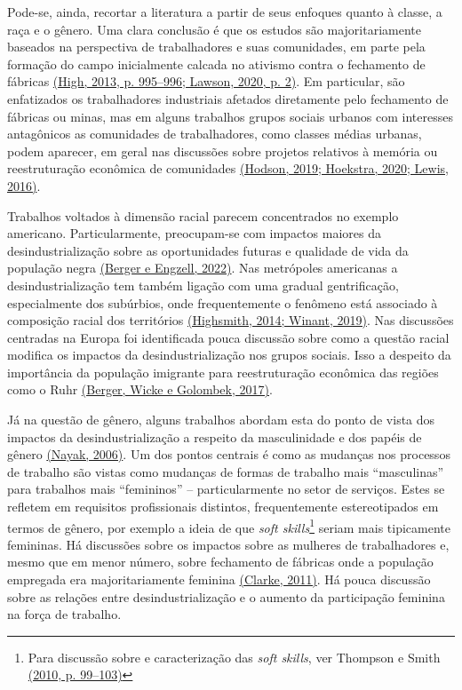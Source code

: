 Pode-se, ainda, recortar a literatura a partir de seus enfoques quanto à
classe, a raça e o gênero. Uma clara conclusão é que os estudos são
majoritariamente baseados na perspectiva de trabalhadores e suas
comunidades, em parte pela formação do campo inicialmente calcada no
ativismo contra o fechamento de fábricas
\href{https://www.zotero.org/google-docs/?ZgRt6K}{(High, 2013, p.
995--996; Lawson, 2020, p. 2)}. Em particular, são enfatizados os
trabalhadores industriais afetados diretamente pelo fechamento de
fábricas ou minas, mas em alguns trabalhos grupos sociais urbanos com
interesses antagônicos as comunidades de trabalhadores, como classes
médias urbanas, podem aparecer, em geral nas discussões sobre projetos
relativos à memória ou reestruturação econômica de comunidades
\href{https://www.zotero.org/google-docs/?73nnBO}{(Hodson, 2019;
Hoekstra, 2020; Lewis, 2016)}.

Trabalhos voltados à dimensão racial parecem concentrados no exemplo
americano. Particularmente, preocupam-se com impactos maiores da
desindustrialização sobre as oportunidades futuras e qualidade de vida
da população negra
\href{https://www.zotero.org/google-docs/?vlrv6U}{(Berger e Engzell,
2022)}. Nas metrópoles americanas a desindustrialização tem também
ligação com uma gradual gentrificação, especialmente dos subúrbios, onde
frequentemente o fenômeno está associado à composição racial dos
territórios
\href{https://www.zotero.org/google-docs/?XohD0P}{(Highsmith, 2014;
Winant, 2019)}. Nas discussões centradas na Europa foi identificada
pouca discussão sobre como a questão racial modifica os impactos da
desindustrialização nos grupos sociais. Isso a despeito da importância
da população imigrante para reestruturação econômica das regiões como o
Ruhr \href{https://www.zotero.org/google-docs/?JhbIrM}{(Berger, Wicke e
Golombek, 2017)}.

Já na questão de gênero, alguns trabalhos abordam esta do ponto de vista
dos impactos da desindustrialização a respeito da masculinidade e dos
papéis de gênero
\href{https://www.zotero.org/google-docs/?iCkdQR}{(Nayak, 2006)}. Um dos
pontos centrais é como as mudanças nos processos de trabalho são vistas
como mudanças de formas de trabalho mais ``masculinas'' para trabalhos
mais ``femininos'' -- particularmente no setor de serviços. Estes se
refletem em requisitos profissionais distintos, frequentemente
estereotipados em termos de gênero, por exemplo a ideia de que
\emph{soft skills}\footnote{Para discussão sobre e caracterização das
  \emph{soft skills}, ver Thompson e Smith
  \href{https://www.zotero.org/google-docs/?BfUnet}{(2010, p. 99--103)}}
seriam mais tipicamente femininas. Há discussões sobre os impactos sobre
as mulheres de trabalhadores e, mesmo que em menor número, sobre
fechamento de fábricas onde a população empregada era majoritariamente
feminina \href{https://www.zotero.org/google-docs/?npTwIO}{(Clarke,
2011)}. Há pouca discussão sobre as relações entre desindustrialização e
o aumento da participação feminina na força de trabalho.

